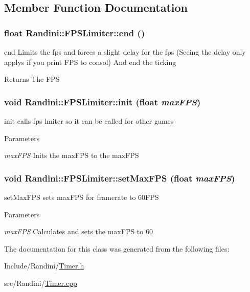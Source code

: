 \subsection{Member Function Documentation}
\hypertarget{classRandini_1_1FPSLimiter_adde6384240089bf3e87ce5d5dc114c60}{
\subsubsection[{end}]{\setlength{\rightskip}{0pt plus 5cm}float Randini::FPSLimiter::end ()}}
\label{classRandini_1_1FPSLimiter_adde6384240089bf3e87ce5d5dc114c60}


end Limits the fps and forces a slight delay for the fps (Seeing the delay only applys if you print FPS to consol) And end the ticking \begin{DoxyReturn}{Returns}
The FPS 
\end{DoxyReturn}
\hypertarget{classRandini_1_1FPSLimiter_a3024a959139c6a9b2d2c583200d69a0c}{
\subsubsection[{init}]{\setlength{\rightskip}{0pt plus 5cm}void Randini::FPSLimiter::init (float {\em maxFPS})}}
\label{classRandini_1_1FPSLimiter_a3024a959139c6a9b2d2c583200d69a0c}


init calls fps lmiter so it can be called for other games 
\begin{DoxyParams}{Parameters}
\item[{\em maxFPS}]Inits the maxFPS to the maxFPS \end{DoxyParams}
\hypertarget{classRandini_1_1FPSLimiter_ab791c46a558dc4f7dfca408f92563bf5}{
\subsubsection[{setMaxFPS}]{\setlength{\rightskip}{0pt plus 5cm}void Randini::FPSLimiter::setMaxFPS (float {\em maxFPS})}}
\label{classRandini_1_1FPSLimiter_ab791c46a558dc4f7dfca408f92563bf5}


setMaxFPS sets maxFPS for framerate to 60FPS 
\begin{DoxyParams}{Parameters}
\item[{\em maxFPS}]Calculates and sets the maxFPS to 60 \end{DoxyParams}


The documentation for this class was generated from the following files:\begin{DoxyCompactItemize}
\item 
Include/Randini/\hyperlink{Timer_8h}{Timer.h}\item 
src/Randini/\hyperlink{Timer_8cpp}{Timer.cpp}\end{DoxyCompactItemize}
